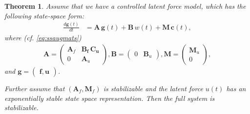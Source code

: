\documentclass[journal]{IEEEtran}
\newtheorem{theorem}{Theorem}[section]
\begin{document}
\begin{theorem}
Assume that we have a controlled latent force model, which has the following state-space form:
%
\begin{equation}
\begin{split}
  \frac{d\mathbf{g}(t)}{dt}
  &= \mathbf{A} \, \mathbf{g}(t)
  + \mathbf{B} \, w(t) + \mathbf{M} \, \mathbf{c}(t),
\end{split}
\end{equation}
%
where (cf. \eqref{eq:ssaugmats})
%
\begin{equation}
\begin{split}
  \mathbf{A}
  = \begin{pmatrix}
	\mathbf{A}_f & \mathbf{\mathbf{B}_f \, \mathbf{C}_u} \\
	0 & \mathbf{A}_u
  \end{pmatrix}, 
  \mathbf{B}
  = \begin{pmatrix}
	0 & \mathbf{B}_u
  \end{pmatrix}, 
  \mathbf{M} = \begin{pmatrix} \mathbf{M}_u \\ 0 \end{pmatrix},
\end{split}
\end{equation}
%
and $\mathbf{g} = \begin{pmatrix} \mathbf{f}, \mathbf{u} \end{pmatrix}$.

Further assume that $(\mathbf{A}_f,\mathbf{M}_f)$ is stabilizable and the latent force $u(t)$ has an exponentially stable state space representation. Then the full system is \emph{stabilizable}.
\end{theorem}
\end{document}
